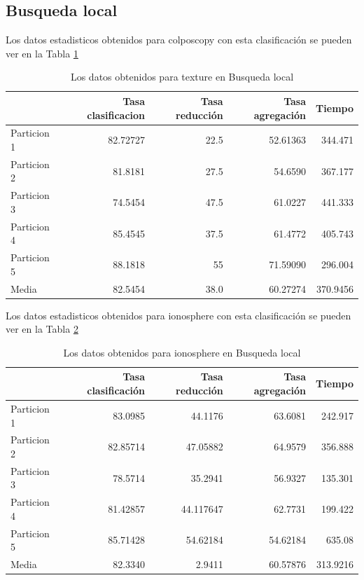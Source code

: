 \documentclass[12pt,a4paper]{article}
\begin{document}
\subsection{Busqueda local}
Los datos estadisticos obtenidos para colposcopy con esta clasificación se pueden ver en la Tabla \ref{tab:rcolposcopy}
\begin{table}[H]
	\centering
	\caption {Los datos obtenidos para texture en Busqueda local} \label{tab:rcolposcopy} 
	
	\begin{tabular}{|l|r|r|r|r|}
		\hline
		& Tasa clasificacion &Tasa reducción &Tasa agregación & Tiempo\\
		\hline
		Particion 1 & 82.72727 &22.5 & 52.61363& 344.471 \\
		\hline
		Particion 2 & 81.8181 & 27.5& 54.6590& 367.177 \\
		\hline
		Particion 3 & 74.5454 & 47.5& 61.0227& 441.333 \\
		\hline
		Particion 4 & 85.4545 & 37.5& 61.4772 &  405.743\\
		\hline
		Particion 5 & 88.1818 & 55&71.59090 & 296.004 \\
		\hline
		Media &82.5454 &38.0 &60.27274 & 370.9456 \\
		\hline
	\end{tabular}
\end{table}
Los datos estadisticos obtenidos para ionosphere con esta clasificación se pueden ver en la Tabla \ref{tab:bionosphere}
\begin{table}[H]
	\centering
	\caption {Los datos obtenidos para ionosphere en Busqueda local} \label{tab:bionosphere} 
	
	\begin{tabular}{|l|r|r|r|r|}
		\hline
		& Tasa clasificación &Tasa reducción &Tasa agregación & Tiempo\\
		\hline
		Particion 1 & 83.0985 &44.1176&63.6081 &242.917 \\
		\hline
		Particion 2 & 82.85714 & 47.05882& 64.9579& 356.888 \\
		\hline
		Particion 3 &  78.5714 & 35.2941& 56.9327&135.301\\
		\hline
		Particion 4 & 81.42857& 44.117647&62.7731 &  199.422\\
		\hline
		Particion 5 & 85.71428 &  54.62184&54.62184 & 635.08 \\
		\hline
		Media & 82.3340 & 2.9411 &60.57876 & 313.9216 \\
		\hline
	\end{tabular}
\end{table}
\end{document}
